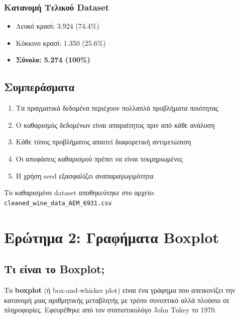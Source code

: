 \documentclass[12pt,a4paper]{article}
\begin{document}
\subsubsection{Κατανομή Τελικού Dataset}

\begin{itemize}
    \item Λευκό κρασί: 3.924 (74.4\%)
    \item Κόκκινο κρασί: 1.350 (25.6\%)
    \item \textbf{Σύνολο: 5.274 (100\%)}
\end{itemize}

\subsection{Συμπεράσματα}

\begin{enumerate}
    \item Τα πραγματικά δεδομένα περιέχουν πολλαπλά προβλήματα ποιότητας
    \item Ο καθαρισμός δεδομένων είναι απαραίτητος πριν από κάθε ανάλυση
    \item Κάθε τύπος προβλήματος απαιτεί διαφορετική αντιμετώπιση
    \item Οι αποφάσεις καθαρισμού πρέπει να είναι τεκμηριωμένες
    \item Η χρήση seed εξασφαλίζει αναπαραγωγιμότητα
\end{enumerate}

Το καθαρισμένο dataset αποθηκεύτηκε στο αρχείο: \texttt{cleaned\_wine\_data\_AEM\_6931.csv}

\newpage
\section{Ερώτημα 2: Γραφήματα Boxplot}

\subsection{Τι είναι το Boxplot;}

Το \textbf{boxplot} (ή box-and-whisker plot) είναι ένα γράφημα που απεικονίζει την κατανομή μιας αριθμητικής μεταβλητής με τρόπο συνοπτικό αλλά πλούσιο σε πληροφορίες. Εφευρέθηκε από τον στατιστικολόγο John Tukey το 1970.
\end{document}
